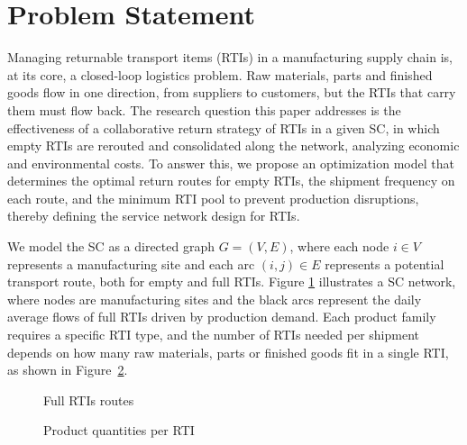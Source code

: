 
\section{Problem Statement}

Managing returnable transport items (RTIs) in a manufacturing supply chain is,
at its core, a closed-loop logistics problem. Raw materials, parts and finished goods flow in one direction, 
from suppliers to customers, but the RTIs that carry them must flow
back. The research question this paper addresses is the effectiveness of a collaborative return strategy of RTIs in a given SC, in which empty RTIs are rerouted and consolidated along the network, analyzing economic and environmental costs. To answer this, we propose an optimization model that determines the optimal return routes for empty RTIs,
the shipment frequency on each route, and the minimum RTI pool to prevent production disruptions, thereby defining the service network design for RTIs.

We model the SC as a directed graph $G = (V, E)$, where each node $i \in V$
represents a manufacturing site and each arc $(i,j) \in E$ represents a
potential transport route, both for empty and full RTIs. Figure \ref{fig:SC} illustrates a SC network,
where nodes are manufacturing sites and the black arcs represent the daily average flows of full
RTIs driven by production demand. Each product family requires a specific RTI
type, and the number of RTIs needed per shipment depends on how many raw materials, parts or finished goods fit
in a single RTI, as shown in Figure~\ref{fig:Product-RTI}.

\begin{figure}[h]
    \centering
        \resizebox{0.5\linewidth}{!}{}
    \caption{ Full RTIs routes }
    \label{fig:SC}
\end{figure}

\begin{figure}[h]
    \centering
        \resizebox{0.5\linewidth}{!}{}
    \caption{ Product quantities per RTI }
    \label{fig:Product-RTI}
\end{figure}

